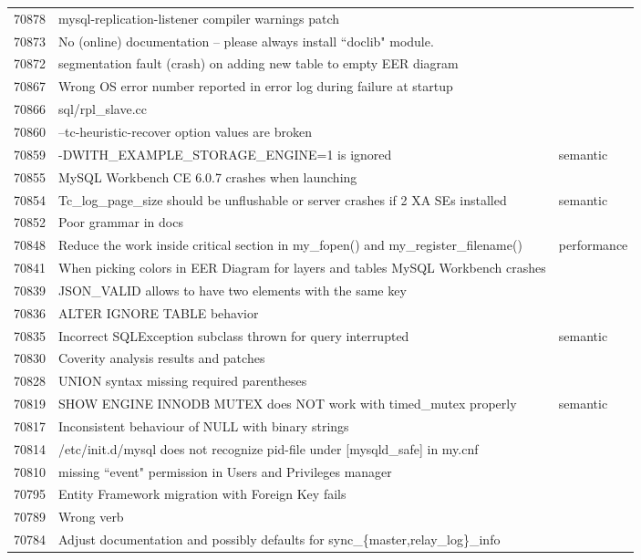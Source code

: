 \begin{longtable}[c]{p{1cm}p{10cm}p{1cm}}
70878 & mysql-replication-listener compiler warnings patch &  \\
70873 & No (online) documentation -- please always install ``doclib" module. &  \\
70872 & segmentation fault (crash) on adding new table to empty EER diagram &  \\
70867 & Wrong OS error number reported in error log during failure at startup &  \\
70866 & sql/rpl\_slave.cc &  \\
70860 & --tc-heuristic-recover option values are broken &  \\
70859 & -DWITH\_EXAMPLE\_STORAGE\_ENGINE=1 is ignored & semantic \\
70855 & MySQL Workbench CE 6.0.7 crashes when launching &  \\
70854 & Tc\_log\_page\_size should be unflushable or server crashes if 2 XA SEs installed & semantic \\
70852 & Poor grammar in docs &  \\
70848 & Reduce the work inside critical section in my\_fopen() and my\_register\_filename() & performance \\
70841 & When picking colors in EER Diagram for layers and tables MySQL Workbench crashes &  \\
70839 & JSON\_VALID allows to have two elements with the same key &  \\
70836 & ALTER IGNORE TABLE behavior &  \\
70835 & Incorrect SQLException subclass thrown for query interrupted & semantic \\
70830 & Coverity analysis results and patches &  \\
70828 & UNION syntax missing required parentheses &  \\
70819 & SHOW ENGINE INNODB MUTEX does NOT work with timed\_mutex properly & semantic \\
70817 & Inconsistent behaviour of NULL with binary strings &  \\
70814 & /etc/init.d/mysql does not recognize pid-file under {[}mysqld\_safe{]} in my.cnf &  \\
70810 & missing ``event" permission in Users and Privileges manager &  \\
70795 & Entity Framework migration with Foreign Key fails &  \\
70789 & Wrong verb &  \\
70784 & Adjust documentation and possibly defaults for sync\_\{master,relay\_log\}\_info &  \\

\end{longtable}
